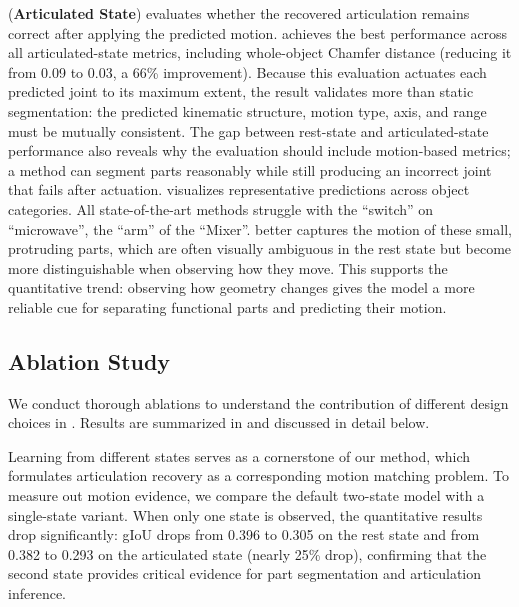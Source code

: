 


 (\textbf{Articulated State}) evaluates whether the recovered articulation remains correct after applying the predicted motion.
\method achieves the best performance across all articulated-state metrics, including whole-object Chamfer distance (reducing it from 0.09 to 0.03, a 66\% improvement).
Because this evaluation actuates each predicted joint to its maximum extent, the result validates more than static segmentation: the predicted kinematic structure, motion type, axis, and range must be mutually consistent.
The gap between rest-state and articulated-state performance also reveals why the evaluation should include motion-based metrics; a method can segment parts reasonably while still producing an incorrect joint that fails after actuation.
 visualizes representative predictions across object categories.
All state-of-the-art methods struggle with the ``switch'' on ``microwave'',
the ``arm'' of the ``Mixer''.
\method better captures the motion of these small, protruding parts, which are often visually ambiguous in the rest state but become more distinguishable when observing how they move.
This supports the quantitative trend: observing how geometry changes gives the model a more reliable cue for separating functional parts and predicting their motion.





\subsection{Ablation Study}
\label{sec:exp_ablations}

We conduct thorough ablations to understand the contribution of different design choices in \method.
Results are summarized in  and discussed in detail below.

Learning from different states serves as a cornerstone of our method,
which formulates articulation recovery as a corresponding motion matching problem.
To measure out motion evidence, we compare the default two-state model with a single-state variant.
When only one state is observed, the quantitative results drop significantly: gIoU drops from 0.396 to 0.305 on the rest state and from 0.382 to 0.293 on the articulated state (nearly 25\% drop), confirming that the second state provides critical evidence for part segmentation and articulation inference.


